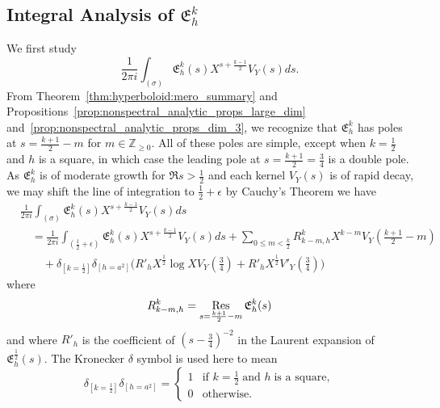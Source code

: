 \subsection{Integral Analysis of $\mathfrak{E}_h^k$}


We first study
\begin{equation}
  \frac{1}{2\pi i} \int_{(\sigma)} \mathfrak{E}_h^k(s) X^{s + \frac{k-1}{2}} V_Y(s) ds.
\end{equation}
From Theorem~\ref{thm:hyperboloid:mero_summary} and
Propositions~\ref{prop:nonspectral_analytic_props_large_dim}
and~\ref{prop:nonspectral_analytic_props_dim_3}, we recognize that $\mathfrak{E}_h^k$ has
poles at $s = \frac{k+1}{2} - m$ for $m \in \mathbb{Z}_{\geq 0}$.
All of these poles are simple, except when $k = \frac{1}{2}$ and $h$ is a square, in which
case the leading pole at $s = \frac{k+1}{2} = \frac{3}{4}$ is a double pole.
As $\mathfrak{E}_h^k$ is of moderate growth for $\Re s > \frac{1}{2}$ and each kernel
$V_Y(s)$ is of rapid decay, we may shift the line of integration to $\frac{1}{2} +
\epsilon$ by Cauchy's Theorem we have
\begin{equation}\label{eq:hyp:integral_MT}
  \begin{split}
    &\frac{1}{2\pi i} \int_{(\sigma)} \mathfrak{E}_h^k(s) X^{s + \frac{k-1}{2}} V_Y(s) ds \\
    &\quad = \frac{1}{2\pi i} \int_{(\frac{1}{2} + \epsilon)} \mathfrak{E}_h^k(s) X^{s +
    \frac{k-1}{2}} V_Y(s) ds + \sum_{0 \leq m < \frac{k}{2}} R_{k-m,h}^k X^{k - m}
    V_Y(\tfrac{k+1}{2} - m) \\
    &\qquad + \delta_{[k=\frac{1}{2}]} \delta_{[h = a^2]} \bigg( R'_h X^{\frac{1}{2}} \log X
  V_Y(\tfrac{3}{4}) + R'_h X^{\frac{1}{2}} V'_Y(\tfrac{3}{4}) \bigg)
  \end{split}
\end{equation}
where
\begin{equation}
  R_{k-m,h}^k = \operatorname*{Res}_{s = \frac{k+1}{2} - m} \mathfrak{E}_h^k(s)
\end{equation}
and where $R'_h$ is the coefficient of $(s - \tfrac{3}{4})^{-2}$ in the Laurent expansion
of $\mathfrak{E}_h^{\frac{1}{2}}(s)$.
The Kronecker $\delta$ symbol is used here to mean
\begin{equation}
  \delta_{[k = \frac{1}{2}]} \delta_{[h = a^2]} = \begin{cases}
    1 & \text{if } k = \frac{1}{2} \; \text{and } h \; \text{is a square}, \\
    0 & \text{otherwise}.
  \end{cases}
\end{equation}




